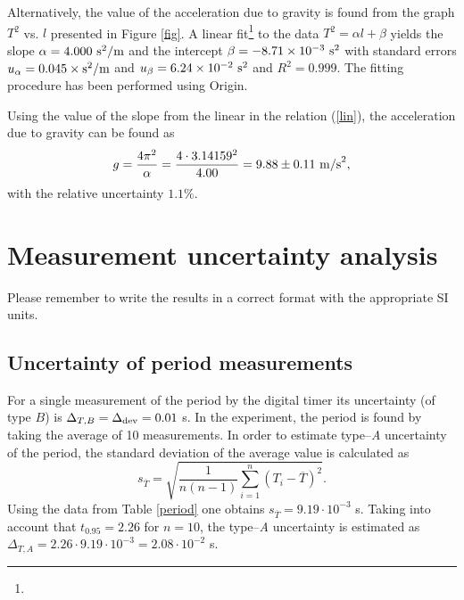 \documentclass{article}
\begin{document}
Alternatively, the value of the acceleration due to gravity is found from the graph $T^2$ vs. $l$ presented in Figure \ref{fig}.
A linear fit\footnote{{\color{blue}{Before fitting a straight line to the data, a statistical test should be run in order to test a hypothesis that the relation between the two quantities may be considered as linear.  For the data discussed in this sample report the test yields no reason to reject such hypothesis. You will learn more about hypotheses testing in a course in probability and statistics.}}} to the data
$T^2 = \alpha l + \beta$ yields the slope $\alpha = 4.000\ {\rm{s^2/m}}$ and the intercept $\beta=-8.71\times10^{-3}\ {\rm{s^2}}$ with standard errors $u_\alpha = 0.045\times {\rm{s^2/m}}$ and $u_\beta = 6.24\times 10^{-2}\ {\rm{s}}^2$ and $R^2=0.999$. The fitting procedure has been performed using Origin.

Using the value of the slope from the linear in the relation (\ref{lin}), the acceleration due to gravity can be found as
\begin{equation}\label{slope}
g = \frac{4\pi^2}{\alpha} = \frac{4\cdot 3.14159^2}{4.00} = 9.88 \pm 0.11\ {\rm{m/s}}^2,
\end{equation}
with the relative uncertainty $1.1\%$.





\section{Measurement uncertainty analysis\label{uncert}}
{ Please remember to write the results in a correct format with the appropriate SI units.}

\subsection{Uncertainty of period measurements}

For a single measurement of the period by the digital timer its uncertainty (of type $B$) is $\Delta_{T,B} = \Delta_{\rm dev}=0.01$ s. In the experiment, the period is found by taking the average of 10 measurements. In order to estimate type--\textit{A} uncertainty of the period, the standard deviation of the average value is calculated as
$$
s_{\overline{T}} = \sqrt{\frac{1}{n(n-1)}\sum\limits_{i=1}^n\left(T_i-\overline{T}\right)^2}.
$$
Using the data from Table \ref{period} one obtains $s_{\overline{T}}=9.19\cdot 10^{-3}$ s.
Taking into account that $t_{0.95} = 2.26$ for $n=10$, the type--\textit{A} uncertainty  is estimated as $\Delta_{T,A} = 2.26\cdot 9.19\cdot 10^{-3}= 2.08 \cdot 10^{-2}$ s. 
\end{document}
